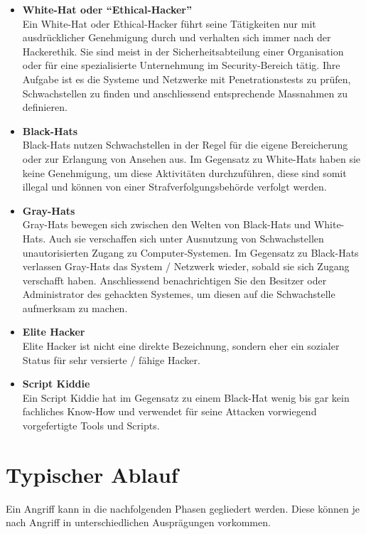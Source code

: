 \begin{itemize}
\item \textbf{White-Hat oder "`Ethical-Hacker"' }\\
Ein White-Hat oder Ethical-Hacker führt seine Tätigkeiten nur mit ausdrücklicher Genehmigung durch und verhalten sich immer nach der Hackerethik. Sie sind meist in der Sicherheitsabteilung einer Organisation oder für eine spezialisierte Unternehmung im Security-Bereich tätig. Ihre Aufgabe ist es die Systeme und Netzwerke mit Penetrationstests zu prüfen, Schwachstellen zu finden und anschliessend entsprechende Massnahmen zu definieren.

\item \textbf{Black-Hats} \\
Black-Hats nutzen Schwachstellen in der Regel für die eigene Bereicherung oder zur Erlangung von Ansehen aus. Im Gegensatz zu White-Hats haben sie keine Genehmigung, um diese Aktivitäten durchzuführen, diese sind somit illegal und können von einer Strafverfolgungsbehörde verfolgt werden.

\item \textbf{Gray-Hats} \\
Gray-Hats bewegen sich zwischen den Welten von Black-Hats und White-Hats. Auch sie verschaffen sich unter Ausnutzung von Schwachstellen unautorisierten Zugang zu Computer-Systemen. Im Gegensatz zu Black-Hats verlassen Gray-Hats das System / Netzwerk wieder, sobald sie sich Zugang verschafft haben. Anschliessend benachrichtigen Sie den Besitzer oder Administrator des gehackten Systemes, um diesen auf die Schwachstelle aufmerksam zu machen.

\item \textbf{Elite Hacker} \\
Elite Hacker ist nicht eine direkte Bezeichnung, sondern eher ein sozialer Status für sehr versierte / fähige Hacker.

\item \textbf{Script Kiddie} \\
Ein Script Kiddie hat im Gegensatz zu einem Black-Hat wenig bis gar kein fachliches Know-How und verwendet für seine Attacken vorwiegend vorgefertigte Tools und Scripts.
\end{itemize}


\section{Typischer Ablauf}
Ein Angriff kann in die nachfolgenden Phasen gegliedert werden. Diese können je nach Angriff in unterschiedlichen Ausprägungen vorkommen.

